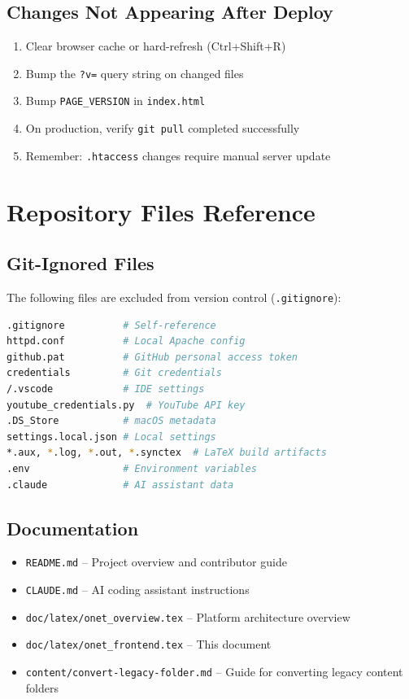 \documentclass[12pt]{article}
\begin{document}
\subsection{Changes Not Appearing After Deploy}

\begin{enumerate}
    \item Clear browser cache or hard-refresh (Ctrl+Shift+R)
    \item Bump the \texttt{?v=} query string on changed files
    \item Bump \texttt{PAGE\_VERSION} in \texttt{index.html}
    \item On production, verify \texttt{git pull} completed successfully
    \item Remember: \texttt{.htaccess} changes require manual server update
\end{enumerate}

\section{Repository Files Reference}

\subsection{Git-Ignored Files}

The following files are excluded from version control (\texttt{.gitignore}):

\begin{lstlisting}[language=bash,numbers=none]
.gitignore          # Self-reference
httpd.conf          # Local Apache config
github.pat          # GitHub personal access token
credentials         # Git credentials
/.vscode            # IDE settings
youtube_credentials.py  # YouTube API key
.DS_Store           # macOS metadata
settings.local.json # Local settings
*.aux, *.log, *.out, *.synctex  # LaTeX build artifacts
.env                # Environment variables
.claude             # AI assistant data
\end{lstlisting}

\subsection{Documentation}

\begin{itemize}
    \item \texttt{README.md} -- Project overview and contributor guide
    \item \texttt{CLAUDE.md} -- AI coding assistant instructions
    \item \texttt{doc/latex/onet\_overview.tex} -- Platform architecture overview
    \item \texttt{doc/latex/onet\_frontend.tex} -- This document
    \item \texttt{content/convert-legacy-folder.md} -- Guide for converting legacy content folders
\end{itemize}
\end{document}

